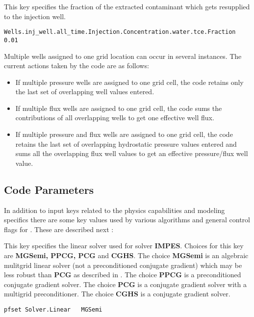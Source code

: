 {
This key specifies the fraction of the extracted contaminant which gets
resupplied to the injection well.
}
\begin{display}\begin{verbatim}
Wells.inj_well.all_time.Injection.Concentration.water.tce.Fraction 0.01
\end{verbatim}\end{display}

\noindent
Multiple wells assigned to one grid location can occur in several
instances.  The current actions taken by the code are as follows:

\begin{itemize}
\item If multiple pressure wells are assigned to one grid cell, the code
      retains only the last set of overlapping well values entered.
\item If multiple flux wells are assigned to one grid cell, the code sums the
      contributions of all overlapping wells to get one effective well flux.
\item If multiple pressure and flux wells are assigned to one grid cell, the
      code retains the last set of overlapping hydrostatic pressure values
      entered and sums all the overlapping flux well values to get an
      effective pressure/flux well value.
\end{itemize}


\subsection{Code Parameters}
\label{Code Parameters}

In addition to input keys related to the physics capabilities
and modeling specifics there are some key values used by various
algorithms and general control flags for \parflow{}.  These
are described next :

{This key specifies the linear solver used for solver {\bf IMPES}.  Choices for this key are {\bf MGSemi, PPCG, PCG} and {\bf   CGHS}.  The choice
{\bf MGSemi} is an algebraic mulitgrid linear solver (not a preconditioned conjugate gradient) which may be less robust than {\bf PCG} as described in \cite{Ashby-Falgout90}.  The choice {\bf PPCG} is a preconditioned conjugate gradient solver.
The choice {\bf PCG} is a conjugate gradient solver with a multigrid preconditioner.  The choice {\bf CGHS} is a conjugate gradient solver.
}
\begin{display}\begin{verbatim}
pfset Solver.Linear   MGSemi
\end{verbatim}\end{display}

